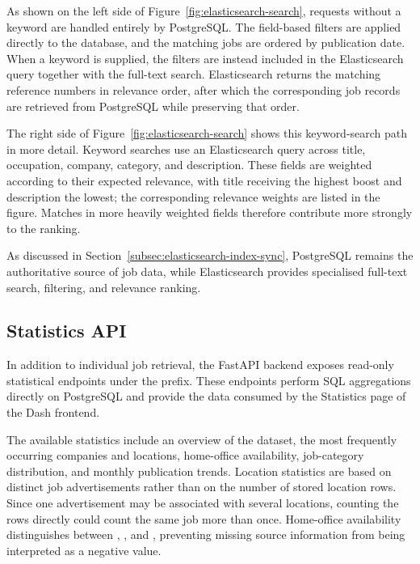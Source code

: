 \documentclass[11pt,a4paper]{article}
\begin{document}
As shown on the left side of Figure~\ref{fig:elasticsearch-search}, requests without a keyword are handled entirely by PostgreSQL. The field-based filters are applied directly to the database, and the matching jobs are ordered by publication date. When a keyword is supplied, the filters are instead included in the Elasticsearch query together with the full-text search. Elasticsearch returns the matching reference numbers in relevance order, after which the corresponding job records are retrieved from PostgreSQL while preserving that order.

The right side of Figure~\ref{fig:elasticsearch-search} shows this keyword-search path in more detail. Keyword searches use an Elasticsearch  query across title, occupation, company, category, and description. These fields are weighted according to their expected relevance, with title receiving the highest boost and description the lowest; the corresponding relevance weights are listed in the figure. Matches in more heavily weighted fields therefore contribute more strongly to the ranking.

As discussed in Section~\ref{subsec:elasticsearch-index-sync}, PostgreSQL remains the authoritative source of job data, while Elasticsearch provides specialised full-text search, filtering, and relevance ranking.


\subsection{Statistics API}

In addition to individual job retrieval, the FastAPI backend exposes read-only statistical endpoints under the  prefix. These endpoints perform SQL aggregations directly on PostgreSQL and provide the data consumed by the Statistics page of the Dash frontend.

The available statistics include an overview of the dataset, the most frequently occurring companies and locations, home-office availability, job-category distribution, and monthly publication trends. Location statistics are based on distinct job advertisements rather than on the number of stored location rows. Since one advertisement may be associated with several locations, counting the rows directly could count the same job more than once. Home-office availability distinguishes between , , and , preventing missing source information from being interpreted as a negative value.
\end{document}
